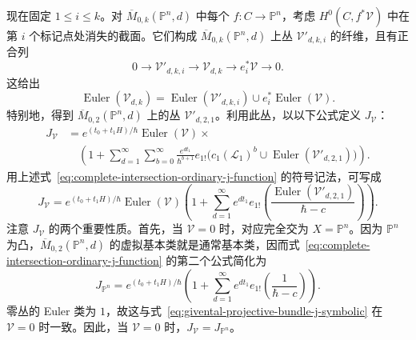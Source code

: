 现在固定 $1\le i\le k$。对 $\overline M_{0,k}(\mathbb P^n,d)$ 中每个 $f:C\to\mathbb P^n$，考虑 $H^0(C,f^*\mathcal V)$ 中在第 $i$ 个标记点处消失的截面。它们构成 $\overline M_{0,k}(\mathbb P^n,d)$ 上丛 $\mathcal V'_{d,k,i}$ 的纤维，且有正合列
\begin{equation}\label{eq:marked-bundle-evaluation-exact-sequence}
0\longrightarrow\mathcal V'_{d,k,i}\longrightarrow\mathcal V_{d,k}
\longrightarrow e_i^*\mathcal V\longrightarrow0.
\end{equation}
这给出
\begin{equation}\label{eq:marked-bundle-euler-factorization}
\operatorname{Euler}(\mathcal V_{d,k})
=\operatorname{Euler}(\mathcal V'_{d,k,i})\cup e_i^*\operatorname{Euler}(\mathcal V).
\end{equation}
特别地，得到 $\overline M_{0,2}(\mathbb P^n,d)$ 上的丛 $\mathcal V'_{d,2,1}$。利用此丛，以以下公式定义 $J_{\mathcal V}$：
\begin{equation}\label{eq:givental-projective-bundle-j-function}
\begin{aligned}
J_{\mathcal V}&=e^{(t_0+t_1H)/\hbar}\operatorname{Euler}(\mathcal V)\times\\
&\quad\left(1+\sum_{d=1}^{\infty}\sum_{b=0}^{\infty}
\frac{e^{dt_1}}{\hbar^{b+1}}
 e_{1!}\bigl(c_1(\mathcal L_1)^b\cup\operatorname{Euler}(\mathcal V'_{d,2,1})\bigr)\right).
\end{aligned}
\end{equation}
用上述式~\eqref{eq:complete-intersection-ordinary-j-function} 的符号记法，可写成
\begin{equation}\label{eq:givental-projective-bundle-j-symbolic}
J_{\mathcal V}=e^{(t_0+t_1H)/\hbar}\operatorname{Euler}(\mathcal V)
\left(1+\sum_{d=1}^{\infty}e^{dt_1}e_{1!}
\left(\frac{\operatorname{Euler}(\mathcal V'_{d,2,1})}{\hbar-c}\right)\right).
\end{equation}
注意 $J_{\mathcal V}$ 的两个重要性质。首先，当 $\mathcal V=0$ 时，对应完全交为 $X=\mathbb P^n$。因为 $\mathbb P^n$ 为凸，$\overline M_{0,2}(\mathbb P^n,d)$ 的虚拟基本类就是通常基本类，因而式~\eqref{eq:complete-intersection-ordinary-j-function} 的第二个公式简化为
\[
J_{\mathbb P^n}=e^{(t_0+t_1H)/\hbar}
\left(1+\sum_{d=1}^{\infty}e^{dt_1}e_{1!}\left(\frac1{\hbar-c}\right)\right).
\]
零丛的 Euler 类为 $1$，故这与式~\eqref{eq:givental-projective-bundle-j-symbolic} 在 $\mathcal V=0$ 时一致。因此，当 $\mathcal V=0$ 时，$J_{\mathcal V}=J_{\mathbb P^n}$。

